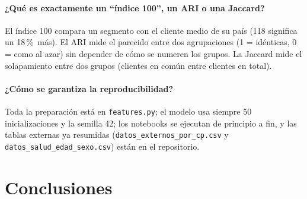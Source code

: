 \documentclass[11pt,a4paper]{article}
\newcommand{\pct}{\,\%}
\begin{document}
\paragraph{¿Qué es exactamente un \enquote{índice 100}, un ARI o una Jaccard?} El índice 100 compara un segmento con el
cliente medio de su país (118 significa un 18\pct\ más). El ARI mide el parecido entre dos agrupaciones (1 = idénticas, 0
= como al azar) sin depender de cómo se numeren los grupos. La Jaccard mide el solapamiento entre dos grupos (clientes en
común entre clientes en total).

\paragraph{¿Cómo se garantiza la reproducibilidad?} Toda la preparación está en \texttt{features.py}; el modelo usa
siempre 50 inicializaciones y la semilla 42; los notebooks se ejecutan de principio a fin, y las tablas externas ya
resumidas (\texttt{datos\_externos\_por\_cp.csv} y \texttt{datos\_salud\_edad\_sexo.csv}) están en el repositorio.

\section{Conclusiones}\label{sec:conclusiones}
\end{document}

